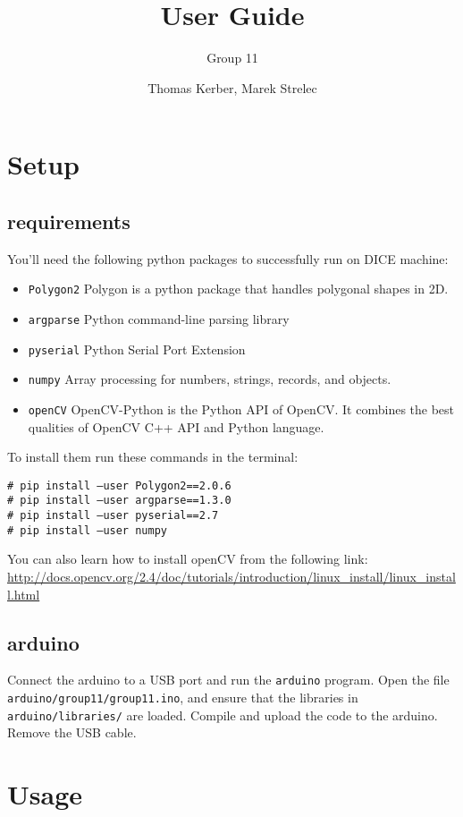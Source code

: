 \documentclass[a4paper]{scrartcl}
\author{Thomas Kerber, Marek Strelec}
\title{User Guide}
\subtitle{Group 11}
\newcommand{\shellcmd}[1]{\indent\indent\texttt{\footnotesize\# #1}}
\begin{document}
\maketitle
\section{Setup}
\subsection{requirements}
You'll need the following python packages to successfully run on DICE machine:

\begin{itemize}
\item \texttt{Polygon2} Polygon is a python package that handles polygonal shapes in 2D. 
\item \texttt{argparse} Python command-line parsing library
\item \texttt{pyserial} Python Serial Port Extension
\item \texttt{numpy} Array processing for numbers, strings, records, and objects.
\item \texttt{openCV} OpenCV-Python is the Python API of OpenCV. It combines the best qualities of OpenCV C++ API and Python language.
\end{itemize}

To install them run these commands in the terminal:

\shellcmd{pip install --user Polygon2==2.0.6} \\
\shellcmd{pip install --user argparse==1.3.0} \\
\shellcmd{pip install --user pyserial==2.7} \\
\shellcmd{pip install --user numpy}  

You can also learn how to install openCV from the following link:
\url{http://docs.opencv.org/2.4/doc/tutorials/introduction/linux_install/linux_install.html}

\subsection{arduino}
Connect the arduino to a USB port and run the \texttt{arduino} program. Open the file \verb$arduino/group11/group11.ino$, and ensure that the libraries in
\verb$arduino/libraries/$ are loaded. Compile and upload the code to the
arduino. Remove the USB cable.


\section{Usage}
\end{document}
